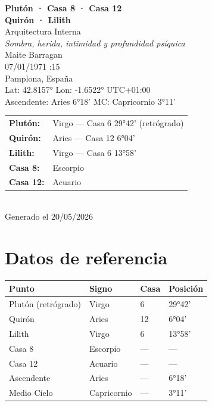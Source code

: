 \documentclass[11pt,a4paper]{article}
\begin{document}
\begin{titlepage}
  \centering
  \vspace*{1.5cm}
  {\Huge\bfseries\color{azulai} Plutón · Casa 8 · Casa 12}\\[0.35cm]
  {\Huge\bfseries\color{azulai} Quirón · Lilith}\\[0.5cm]
  {\large\color{grisai} Arquitectura Interna}\\[0.3cm]
  {\small\itshape\color{grisai} Sombra, herida, intimidad y profundidad psíquica}\\[2cm]
  {\huge\color{doradoai} Maite Barragan}\\[1.5cm]
  {\Large 07/01/1971 :15}\\[0.3cm]
  {\Large Pamplona, España}\\[0.3cm]
  {\normalsize Lat: 42.8157° \quad Lon: -1.6522° \quad UTC+01:00}\\[0.3cm]
  {\normalsize Ascendente: Aries 6°18' \quad
    MC: Capricornio 3°11'}\\[2cm]

  \begin{tabular}{ll}
    \textbf{Plutón:}  & Virgo — Casa 6 29°42' (retrógrado) \\
    \textbf{Quirón:}  & Aries — Casa 12 6°04' \\
    \textbf{Lilith:}  & Virgo — Casa 6 13°58' \\
    \textbf{Casa 8:}  & Escorpio \\
    \textbf{Casa 12:} & Acuario \\
  \end{tabular}\\[2cm]

  \vfill
  {\small Generado el 20/05/2026}
\end{titlepage}

\tableofcontents
\newpage

\section{Datos de referencia}

\begin{center}
\begin{tabular}{llll}
  \toprule
  \textbf{Punto} & \textbf{Signo} & \textbf{Casa} & \textbf{Posición} \\
  \midrule
  Plutón (retrógrado) & Virgo & 6 & 29°42' \\
  Quirón & Aries & 12 & 6°04' \\
  Lilith          & Virgo & 6 & 13°58' \\
  Casa 8          & Escorpio             & ---                  & --- \\
  Casa 12         & Acuario            & ---                  & --- \\
  Ascendente      & Aries         & ---                  & 6°18' \\
  Medio Cielo     & Capricornio          & ---                  & 3°11' \\
  \bottomrule
\end{tabular}
\end{center}
\end{document}
